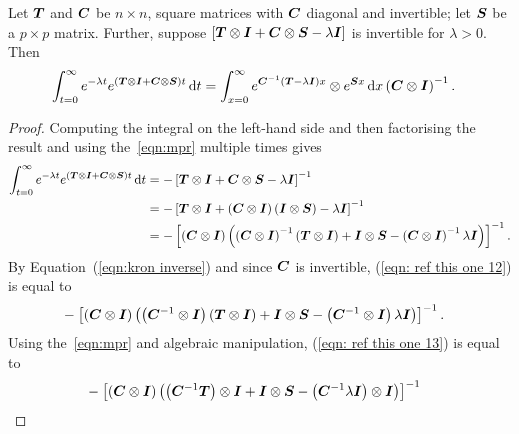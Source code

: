 \begin{lem}\label{lem: lst mpr}
	Let \(\boldsymbol{T}\) and \(\boldsymbol{C}\) be \(n\times n\), square matrices with \(\boldsymbol{C}\) diagonal and invertible; let \(\boldsymbol{S}\) be a \(p\times p\) matrix. Further, suppose \(\left[\boldsymbol{T}\otimes \boldsymbol{I} + \boldsymbol{C}\otimes \boldsymbol{S} - \lambda \boldsymbol{I}\right]\) is invertible for \(\lambda>0\). Then
\begin{align}
	&\int_{t=0}^\infty e^{-\lambda t}  e^{{\left(\boldsymbol{T}\otimes \boldsymbol{I} + \boldsymbol{C}\otimes \boldsymbol{S}\right)t}} \, \mathrm{d} t 
	=   \int_{x=0}^\infty e^{{\boldsymbol{C}^{-1}\left(\boldsymbol{T}-\lambda \boldsymbol{I}\right)x}}\otimes e^{\boldsymbol{S}x} \, \mathrm{d} x \left(\boldsymbol{C}\otimes \boldsymbol{I}\right)^{-1}.  \label{eqn:lstsimplify}\end{align}
\end{lem}
\begin{proof}
	Computing the integral on the left-hand side and then factorising the result and using the~\ref{eqn:mpr} multiple times gives
	\begin{align}
            	\int_{t=0}^\infty e^{-\lambda t} e^{\left(\boldsymbol{T}\otimes \boldsymbol{I} + \boldsymbol{C}\otimes \boldsymbol{S}\right)t} \, \mathrm{d} t\nonumber 
            	&= - \left[\boldsymbol{T}\otimes \boldsymbol{I} + \boldsymbol{C}\otimes \boldsymbol{S} - \lambda \boldsymbol{I}\right]^{-1}
		\\&= -  \left[\boldsymbol{T}\otimes \boldsymbol{I} + \left(\boldsymbol{C}\otimes \boldsymbol{I}\right)\left(\boldsymbol{I}\otimes \boldsymbol{S}\right) - \lambda \boldsymbol{I}\right]^{-1}\nonumber
		\\&= -  \left[\left(\boldsymbol{C}\otimes \boldsymbol{I}\right)\left(\left(\boldsymbol{C}\otimes \boldsymbol{I}\right)^{-1}\left(\boldsymbol{T}\otimes \boldsymbol{I} \right)+ \boldsymbol{I}\otimes \boldsymbol{S} - \left(\boldsymbol{C}\otimes \boldsymbol{I}\right)^{-1}\lambda \boldsymbol{I}\right)\right]^{-1}. \label{eqn: ref this one 12}
	\end{align}
	By Equation~(\ref{eqn:kron inverse}) and since \(\boldsymbol{C}\) is invertible, (\ref{eqn: ref this one 12}) is equal to
	\begin{align}
		& - \left[\left(\boldsymbol{C}\otimes \boldsymbol{I}\right)\left(\left(\boldsymbol{C}^{-1}\otimes \boldsymbol{I}\right)\left(\boldsymbol{T}\otimes \boldsymbol{I} \right)+ \boldsymbol{I}\otimes \boldsymbol{S} - \left(\boldsymbol{C}^{-1}\otimes \boldsymbol{I}\right)\lambda \boldsymbol{I}\right)\right]^{-1}. \label{eqn: ref this one 13}
	\end{align}
	{Using the~\ref{eqn:mpr} and algebraic manipulation, (\ref{eqn: ref this one 13}) is equal to }
	\begin{align}
		&- \left[\left(\bs{C}\otimes \bs{I}\right)\left(\left(\bs{C}^{-1}\bs{T}\right)\otimes \bs{I} + \bs{I}\otimes \bs{S} - \left(\bs{C}^{-1}\lambda \bs{I}\right)\otimes \bs{I}\right)\right]^{-1} \nonumber

\end{align}
\end{proof}
